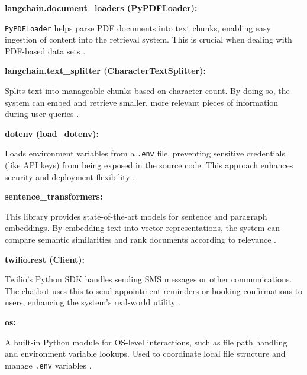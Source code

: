 \vspace{0.4cm}
\noindent\textbf{langchain.document\_loaders (PyPDFLoader):}

\noindent
\texttt{PyPDFLoader} helps parse PDF documents into text chunks, enabling easy ingestion of content into the retrieval 
system. This is crucial when dealing with PDF-based data sets \cite{pythonlibrary}.

\vspace{0.4cm}
\noindent\textbf{langchain.text\_splitter (CharacterTextSplitter):}

\noindent
Splits text into manageable chunks based on character count. By doing so, the system can embed and retrieve smaller, 
more relevant pieces of information during user queries \cite{pythonlibrary}.

\vspace{0.4cm}
\noindent\textbf{dotenv (load\_dotenv):}

\noindent
Loads environment variables from a \texttt{.env} file, preventing sensitive credentials (like API keys) from 
being exposed in the source code. This approach enhances security and deployment flexibility \cite{pythonlibrary}.

\vspace{0.4cm}
\noindent\textbf{sentence\_transformers:}

\noindent
This library provides state-of-the-art models for sentence and paragraph embeddings. By embedding text into vector 
representations, the system can compare semantic similarities and rank documents according to relevance \cite{pythonlibrary}.

\vspace{0.4cm}
\noindent\textbf{twilio.rest (Client):}

\noindent
Twilio’s Python SDK handles sending SMS messages or other communications. The chatbot uses this to send appointment 
reminders or booking confirmations to users, enhancing the system’s real-world utility \cite{pythonlibrary}.

\vspace{0.4cm}
\noindent\textbf{os:}

\noindent
A built-in Python module for OS-level interactions, such as file path handling and environment variable lookups. 
Used to coordinate local file structure and manage \texttt{.env} variables \cite{pythonlibrary}.

